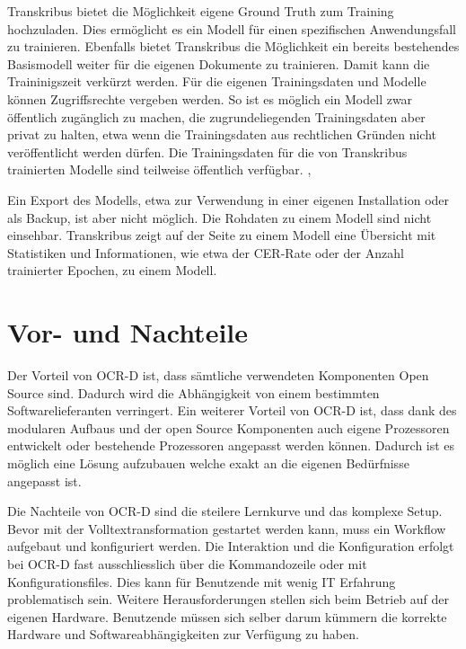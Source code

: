 \documentclass[a4paper,oneside, 12pt]{report}
\begin{document}
Transkribus bietet die Möglichkeit eigene Ground Truth zum Training hochzuladen. Dies ermöglicht es ein Modell für einen spezifischen Anwendungsfall zu trainieren. Ebenfalls bietet Transkribus die Möglichkeit ein bereits bestehendes Basismodell weiter für die eigenen Dokumente zu trainieren. Damit kann die Traininigszeit verkürzt werden. Für die eigenen Trainingsdaten und Modelle können Zugriffsrechte vergeben werden. So ist es möglich ein Modell zwar öffentlich zugänglich zu machen, die zugrundeliegenden Trainingsdaten aber privat zu halten, etwa wenn die Trainingsdaten aus rechtlichen Gründen nicht veröffentlicht werden dürfen. Die Trainingsdaten für die von Transkribus trainierten Modelle sind teilweise öffentlich verfügbar. \cite{diem_markus_2017_1491441}, \cite{transkribusmodels}

Ein Export des Modells, etwa zur Verwendung in einer eigenen Installation oder als Backup, ist aber nicht möglich. Die Rohdaten zu einem Modell sind nicht einsehbar. Transkribus zeigt auf der Seite zu einem Modell eine Übersicht mit Statistiken und Informationen, wie etwa der CER-Rate oder der Anzahl trainierter Epochen, zu einem Modell. \cite{transkribusmodels}


\section{Vor- und Nachteile}
Der Vorteil von OCR-D ist, dass sämtliche verwendeten Komponenten Open Source sind. Dadurch wird die Abhängigkeit von einem bestimmten Softwarelieferanten verringert. Ein weiterer Vorteil von OCR-D ist, dass dank des modularen Aufbaus und der open Source Komponenten auch eigene Prozessoren entwickelt oder bestehende Prozessoren angepasst werden können. Dadurch ist es möglich eine Lösung aufzubauen welche exakt an die eigenen Bedürfnisse angepasst ist.

Die Nachteile von OCR-D sind die steilere Lernkurve und das komplexe Setup. Bevor mit der Volltextransformation gestartet werden kann, muss ein Workflow aufgebaut und konfiguriert werden. Die Interaktion und die Konfiguration erfolgt bei OCR-D fast ausschliesslich über die Kommandozeile oder mit Konfigurationsfiles. Dies kann für Benutzende mit wenig IT Erfahrung problematisch sein. Weitere Herausforderungen stellen sich beim Betrieb auf der eigenen Hardware. Benutzende müssen sich selber darum kümmern die korrekte Hardware und Softwareabhängigkeiten zur Verfügung zu haben.
\end{document}
